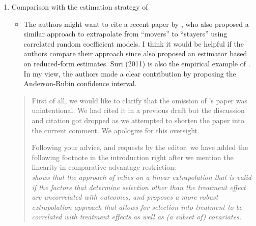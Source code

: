 \documentclass{article}[11pt]
\begin{document}
\begin{enumerate}
\begin{itemize}
\begin{quote}
        \textit{We investigate these discrepancies and relate them to the potential for weak identification of $\phi$.}
          
      \end{quote}
    \end{itemize}
    
  \item Comparison with the estimation strategy of \citet{V2020}
  \begin{itemize}
      \item The authors might want to cite a recent paper by \citet{V2020} , who also proposed a similar approach to extrapolate from ``movers'' to ``stayers'' using correlated random coefficient models. I think it would be helpful if the authors compare their approach since \citet{V2020} also proposed an estimator based on reduced-form estimates. Suri (2011) is also the empirical example of \citet{V2020}. In my view, the authors made a clear contribution by proposing the Anderson-Rubin confidence interval.
  \end{itemize}
\begin{quote}
    First of all, we would like to clarify that the omission of \citet{V2020}'s paper was unintentional. We had cited it in a previous draft but the discussion and citation got dropped as we attempted to shorten the paper into the current comment. We apologize for this oversight.\newline 
    
    Following your advice, and requests by the editor, we have added the following footnote in the introduction right after we mention the linearity-in-comparative-advantage restriction:\\
    
    \emph{\citet{V2020} shows that the approach of \citet{S2011} relies on a linear extrapolation that is valid if the factors that determine selection other than the treatment effect are uncorrelated with outcomes, and proposes a more robust extrapolation approach that allows for selection into treatment to be correlated with treatment effects as well as (a subset of) covariates. }
\end{quote}
\end{enumerate}


\end{document}
